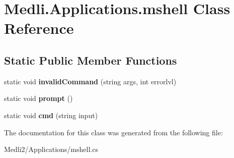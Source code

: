 \hypertarget{class_medli_1_1_applications_1_1mshell}{}\section{Medli.\+Applications.\+mshell Class Reference}
\label{class_medli_1_1_applications_1_1mshell}
\subsection*{Static Public Member Functions}
\begin{DoxyCompactItemize}
\item 
\mbox{\label{class_medli_1_1_applications_1_1mshell_af46a677dd54f57f41bc4ba56a10ae856}} 
static void {\bfseries invalid\+Command} (string args, int errorlvl)
\item 
\mbox{\label{class_medli_1_1_applications_1_1mshell_a4a7b909fa48156d903675fe9f1e16b14}} 
static void {\bfseries prompt} ()
\item 
\mbox{\label{class_medli_1_1_applications_1_1mshell_a9c54964d3903e50631ecbc14258f6ce1}} 
static void {\bfseries cmd} (string input)
\end{DoxyCompactItemize}


The documentation for this class was generated from the following file\+:\begin{DoxyCompactItemize}
\item 
Medli2/\+Applications/mshell.\+cs\end{DoxyCompactItemize}
